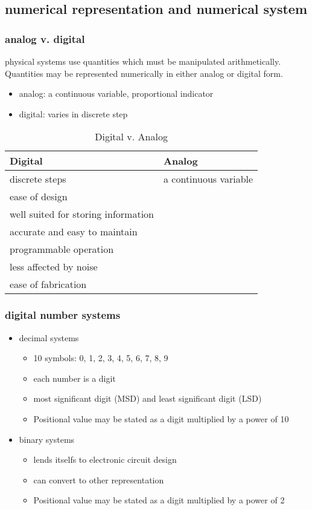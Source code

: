 \documentclass[11pt]{article}
\begin{document}
\subsection{numerical representation and numerical system}
\label{sec:org7ea9f90}
\subsubsection{analog v. digital}
\label{sec:orga9c06c3}
physical systems use quantities which must be manipulated
arithmetically. Quantities may be represented numerically in either analog or
digital form.
\begin{itemize}
\item analog: a continuous variable, proportional indicator
\item digital: varies in discrete step
\end{itemize}
\begin{table}[htbp]
\caption{Digital v. Analog}
\centering
\begin{tabular}{ll}
Digital & Analog\\
\hline
discrete steps & a continuous variable\\
ease of design & \\
well suited for storing information & \\
accurate and easy to maintain & \\
programmable operation & \\
less affected by noise & \\
ease of fabrication & \\
\end{tabular}
\end{table}
\subsubsection{digital number systems}
\label{sec:org9d99af2}
\begin{itemize}
\item decimal systems
\begin{itemize}
\item 10 symbols: 0, 1, 2, 3, 4, 5, 6, 7, 8, 9
\item each number is a digit
\item most significant digit (MSD) and least significant digit (LSD)
\item Positional value may be stated as a digit multiplied by a power of 10
\end{itemize}
\item binary systems
\begin{itemize}
\item lends itselfs to electronic circuit design
\item can convert to other representation
\item Positional value may be stated as a digit multiplied by a power of 2
\end{itemize}
\end{itemize}
\end{document}
